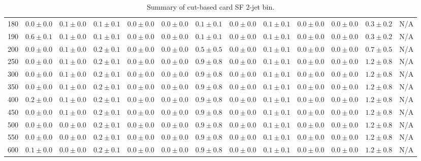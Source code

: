\begin{table}
{\begin{center}
\begin{tabular}{l | c c | c c c c c c c c  | c c}
180 & $0.0\pm0.0$ & $0.1\pm0.0$ & $0.1\pm0.1$ & $0.0\pm0.0$ & $0.0\pm0.0$ & $0.1\pm0.1$ & $0.0\pm0.0$ & $0.1\pm0.1$ & $0.0\pm0.0$ & $0.0\pm0.0$ & $0.3\pm0.2$ & N/A \\
190 & $0.6\pm0.1$ & $0.1\pm0.0$ & $0.1\pm0.1$ & $0.0\pm0.0$ & $0.0\pm0.0$ & $0.1\pm0.1$ & $0.0\pm0.0$ & $0.1\pm0.1$ & $0.0\pm0.0$ & $0.0\pm0.0$ & $0.3\pm0.2$ & N/A \\
200 & $0.0\pm0.0$ & $0.1\pm0.0$ & $0.2\pm0.1$ & $0.0\pm0.0$ & $0.0\pm0.0$ & $0.5\pm0.5$ & $0.0\pm0.0$ & $0.1\pm0.1$ & $0.0\pm0.0$ & $0.0\pm0.0$ & $0.7\pm0.5$ & N/A \\
250 & $0.0\pm0.0$ & $0.1\pm0.0$ & $0.2\pm0.1$ & $0.0\pm0.0$ & $0.0\pm0.0$ & $0.9\pm0.8$ & $0.0\pm0.0$ & $0.1\pm0.1$ & $0.0\pm0.0$ & $0.0\pm0.0$ & $1.2\pm0.8$ & N/A \\
300 & $0.0\pm0.0$ & $0.1\pm0.0$ & $0.2\pm0.1$ & $0.0\pm0.0$ & $0.0\pm0.0$ & $0.9\pm0.8$ & $0.0\pm0.0$ & $0.1\pm0.1$ & $0.0\pm0.0$ & $0.0\pm0.0$ & $1.2\pm0.8$ & N/A \\
350 & $0.0\pm0.0$ & $0.1\pm0.0$ & $0.2\pm0.1$ & $0.0\pm0.0$ & $0.0\pm0.0$ & $0.9\pm0.8$ & $0.0\pm0.0$ & $0.1\pm0.1$ & $0.0\pm0.0$ & $0.0\pm0.0$ & $1.2\pm0.8$ & N/A \\
400 & $0.2\pm0.0$ & $0.1\pm0.0$ & $0.2\pm0.1$ & $0.0\pm0.0$ & $0.0\pm0.0$ & $0.9\pm0.8$ & $0.0\pm0.0$ & $0.1\pm0.1$ & $0.0\pm0.0$ & $0.0\pm0.0$ & $1.2\pm0.8$ & N/A \\
450 & $0.0\pm0.0$ & $0.1\pm0.0$ & $0.2\pm0.1$ & $0.0\pm0.0$ & $0.0\pm0.0$ & $0.9\pm0.8$ & $0.0\pm0.0$ & $0.1\pm0.1$ & $0.0\pm0.0$ & $0.0\pm0.0$ & $1.2\pm0.8$ & N/A \\
500 & $0.0\pm0.0$ & $0.0\pm0.0$ & $0.2\pm0.1$ & $0.0\pm0.0$ & $0.0\pm0.0$ & $0.9\pm0.8$ & $0.0\pm0.0$ & $0.1\pm0.1$ & $0.0\pm0.0$ & $0.0\pm0.0$ & $1.2\pm0.8$ & N/A \\
550 & $0.0\pm0.0$ & $0.0\pm0.0$ & $0.2\pm0.1$ & $0.0\pm0.0$ & $0.0\pm0.0$ & $0.9\pm0.8$ & $0.0\pm0.0$ & $0.1\pm0.1$ & $0.0\pm0.0$ & $0.0\pm0.0$ & $1.2\pm0.8$ & N/A \\
600 & $0.1\pm0.0$ & $0.0\pm0.0$ & $0.2\pm0.1$ & $0.0\pm0.0$ & $0.0\pm0.0$ & $0.9\pm0.8$ & $0.0\pm0.0$ & $0.1\pm0.1$ & $0.0\pm0.0$ & $0.0\pm0.0$ & $1.2\pm0.8$ & N/A \\
\hline
\end{tabular}
\end{center}
}
\caption{Summary of cut-based card SF 2-jet bin.}
\end{table}
